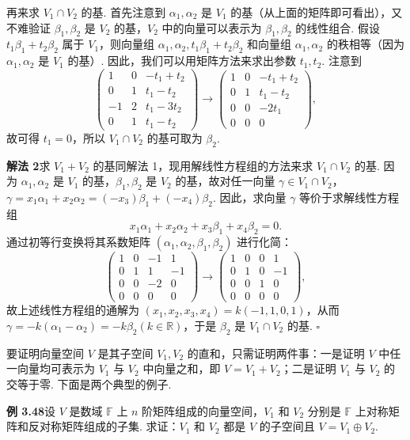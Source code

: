 \documentclass[UTF8, 12pt, fontset=fandol, oneside]{ctexart}
\begin{document}
再来求 $V_1\cap V_2$ 的基. 首先注意到 $\alpha_1,\alpha_2$ 是 $V_1$ 的基（从上面的矩阵即可看出），又不难验证 $\beta_1,\beta_2$ 是 $V_2$ 的基，$V_2$ 中的向量可以表示为 $\beta_1,\beta_2$ 的线性组合. 假设 $t_1\beta_1+t_2\beta_2$ 属于 $V_1$，则向量组 $\alpha_1,\alpha_2,t_1\beta_1+t_2\beta_2$ 和向量组 $\alpha_1,\alpha_2$ 的秩相等（因为 $\alpha_1,\alpha_2$ 是 $V_1$ 的基）. 因此，我们可以用矩阵方法来求出参数 $t_1,t_2$. 注意到
\[
\begin{pmatrix}
1 & 0 & -t_1+t_2\\
0 & 1 & t_1-t_2\\
-1 & 2 & t_1-3t_2\\
0 & 1 & t_1-t_2
\end{pmatrix}
\to
\begin{pmatrix}
1 & 0 & -t_1+t_2\\
0 & 1 & t_1-t_2\\
0 & 0 & -2t_1\\
0 & 0 & 0
\end{pmatrix},
\]
故可得 $t_1=0$，所以 $V_1\cap V_2$ 的基可取为 $\beta_2$.

\noindent\textbf{解法 2}\quad 求 $V_1+V_2$ 的基同解法 1，现用解线性方程组的方法来求 $V_1\cap V_2$ 的基. 因为 $\alpha_1,\alpha_2$ 是 $V_1$ 的基，$\beta_1,\beta_2$ 是 $V_2$ 的基，故对任一向量 $\gamma\in V_1\cap V_2$，$\gamma=x_1\alpha_1+x_2\alpha_2=(-x_3)\beta_1+(-x_4)\beta_2$. 因此，求向量 $\gamma$ 等价于求解线性方程组
\[
x_1\alpha_1+x_2\alpha_2+x_3\beta_1+x_4\beta_2=0.
\]
通过初等行变换将其系数矩阵 $(\alpha_1,\alpha_2,\beta_1,\beta_2)$ 进行化简：
\[
\begin{pmatrix}
1&0&-1&1\\
0&1&1&-1\\
0&0&-2&0\\
0&0&0&0
\end{pmatrix}
\to
\begin{pmatrix}
1&0&0&1\\
0&1&0&-1\\
0&0&1&0\\
0&0&0&0
\end{pmatrix},
\]
故上述线性方程组的通解为 $(x_1,x_2,x_3,x_4)=k(-1,1,0,1)$，从而 $\gamma=-k(\alpha_1-\alpha_2)=-k\beta_2(k\in\mathbb{R})$，于是 $\beta_2$ 是 $V_1\cap V_2$ 的基. $\square$

要证明向量空间 $V$ 是其子空间 $V_1,V_2$ 的直和，只需证明两件事：一是证明 $V$ 中任一向量均可表示为 $V_1$ 与 $V_2$ 中向量之和，即 $V=V_1+V_2$；二是证明 $V_1$ 与 $V_2$ 的交等于零. 下面是两个典型的例子.

\noindent\textbf{例 3.48}\quad 设 $V$ 是数域 $\mathbb{F}$ 上 $n$ 阶矩阵组成的向量空间，$V_1$ 和 $V_2$ 分别是 $\mathbb{F}$ 上对称矩阵和反对称矩阵组成的子集. 求证：$V_1$ 和 $V_2$ 都是 $V$ 的子空间且 $V=V_1\oplus V_2$.
\end{document}
